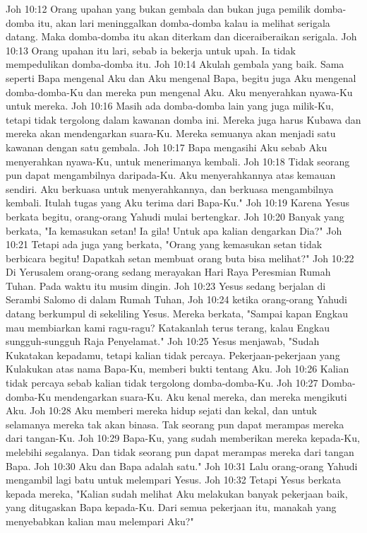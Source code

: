 Joh 10:12  Orang upahan yang bukan gembala dan bukan juga pemilik domba-domba itu, akan lari meninggalkan domba-domba kalau ia melihat serigala datang. Maka domba-domba itu akan diterkam dan diceraiberaikan serigala.
Joh 10:13  Orang upahan itu lari, sebab ia bekerja untuk upah. Ia tidak mempedulikan domba-domba itu.
Joh 10:14  Akulah gembala yang baik. Sama seperti Bapa mengenal Aku dan Aku mengenal Bapa, begitu juga Aku mengenal domba-domba-Ku dan mereka pun mengenal Aku. Aku menyerahkan nyawa-Ku untuk mereka.
Joh 10:16  Masih ada domba-domba lain yang juga milik-Ku, tetapi tidak tergolong dalam kawanan domba ini. Mereka juga harus Kubawa dan mereka akan mendengarkan suara-Ku. Mereka semuanya akan menjadi satu kawanan dengan satu gembala.
Joh 10:17  Bapa mengasihi Aku sebab Aku menyerahkan nyawa-Ku, untuk menerimanya kembali.
Joh 10:18  Tidak seorang pun dapat mengambilnya daripada-Ku. Aku menyerahkannya atas kemauan sendiri. Aku berkuasa untuk menyerahkannya, dan berkuasa mengambilnya kembali. Itulah tugas yang Aku terima dari Bapa-Ku."
Joh 10:19  Karena Yesus berkata begitu, orang-orang Yahudi mulai bertengkar.
Joh 10:20  Banyak yang berkata, "Ia kemasukan setan! Ia gila! Untuk apa kalian dengarkan Dia?"
Joh 10:21  Tetapi ada juga yang berkata, "Orang yang kemasukan setan tidak berbicara begitu! Dapatkah setan membuat orang buta bisa melihat?"
Joh 10:22  Di Yerusalem orang-orang sedang merayakan Hari Raya Peresmian Rumah Tuhan. Pada waktu itu musim dingin.
Joh 10:23  Yesus sedang berjalan di Serambi Salomo di dalam Rumah Tuhan,
Joh 10:24  ketika orang-orang Yahudi datang berkumpul di sekeliling Yesus. Mereka berkata, "Sampai kapan Engkau mau membiarkan kami ragu-ragu? Katakanlah terus terang, kalau Engkau sungguh-sungguh Raja Penyelamat."
Joh 10:25  Yesus menjawab, "Sudah Kukatakan kepadamu, tetapi kalian tidak percaya. Pekerjaan-pekerjaan yang Kulakukan atas nama Bapa-Ku, memberi bukti tentang Aku.
Joh 10:26  Kalian tidak percaya sebab kalian tidak tergolong domba-domba-Ku.
Joh 10:27  Domba-domba-Ku mendengarkan suara-Ku. Aku kenal mereka, dan mereka mengikuti Aku.
Joh 10:28  Aku memberi mereka hidup sejati dan kekal, dan untuk selamanya mereka tak akan binasa. Tak seorang pun dapat merampas mereka dari tangan-Ku.
Joh 10:29  Bapa-Ku, yang sudah memberikan mereka kepada-Ku, melebihi segalanya. Dan tidak seorang pun dapat merampas mereka dari tangan Bapa.
Joh 10:30  Aku dan Bapa adalah satu."
Joh 10:31  Lalu orang-orang Yahudi mengambil lagi batu untuk melempari Yesus.
Joh 10:32  Tetapi Yesus berkata kepada mereka, "Kalian sudah melihat Aku melakukan banyak pekerjaan baik, yang ditugaskan Bapa kepada-Ku. Dari semua pekerjaan itu, manakah yang menyebabkan kalian mau melempari Aku?"
